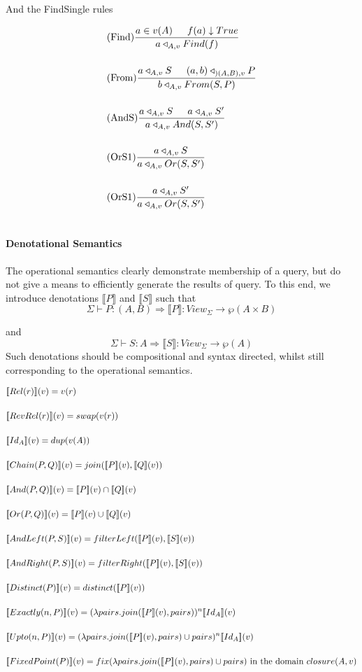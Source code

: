 \documentclass[12pt,a4paper,twoside,openright]{report}
\newcommand{\db}[1]{{\bf [\![}#1{\bf ]\!]}}
\newcommand{\deno}[1]{\db{#1}(v)}
\newcommand{\clos}[0]{closure(A, v)}
\newcommand{\opRule}[3]{#1 \triangleleft_{#2, v} #3}
\begin{document}
And the FindSingle rules

\begin{align}
&\displaystyle\mbox{(Find)}\frac{a \in v(A) \indent f(a)\downarrow True}{\opRule{a}{A}{Find(f)}} \\[3ex]
&\displaystyle\mbox{(From)}\frac{\opRule{a}{A}{S} \indent \opRule{(a,b)}{)(A, B)}{P}}{\opRule{b}{A}{From(S, P)}} \\[3ex]
&\displaystyle\mbox{(AndS)}\frac{\opRule{a}{A}{S} \indent \opRule{a}{A}{S'}}{\opRule{a}{A}{And(S, S')}} \\[3ex]
&\displaystyle\mbox{(OrS1)}\frac{\opRule{a}{A}{S}}{\opRule{a}{A}{Or(S, S')}} \\[3ex]
&\displaystyle\mbox{(OrS1)}\frac{\opRule{a}{A}{S'}}{\opRule{a}{A}{Or(S, S')}} \\[3ex]
\end{align}
\paragraph{Denotational Semantics}
The operational semantics clearly demonstrate membership of a query, but do not give a means to efficiently generate the results of query. To this end, we introduce denotations $\llbracket P \rrbracket$ and $\llbracket S \rrbracket$ such that \[\Sigma \vdash P \colon (A, B) \Rightarrow\llbracket P \rrbracket \colon View_{\Sigma} \rightarrow \wp(A \times B)\]

and \[\Sigma \vdash S \colon A \Rightarrow\llbracket S \rrbracket \colon View_{\Sigma} \rightarrow \wp(A)\] Such denotations should be compositional and syntax directed, whilst still corresponding to the operational semantics.

\begin{align}
& \deno{Rel(r)} = v(r) \\[3ex]
& \deno{RevRel(r)} = swap(v(r)) \\[3ex]
& \deno{Id_A} = dup(v(A)) \\[3ex]
& \deno{Chain(P, Q)} = join(\deno{P}, \deno{Q}) \\[3ex]
& \deno{And(P, Q)} = \deno{P} \cap \deno{Q} \\[3ex]
& \deno{Or(P, Q)} = \deno{P} \cup \deno{Q} \\[3ex]
& \deno{AndLeft(P, S)} = filterLeft(\deno{P}, \deno{S}) \\[3ex]
& \deno{AndRight(P, S)} = filterRight(\deno{P}, \deno{S}) \\[3ex]
& \deno{Distinct(P)} = distinct(\deno{P}) \\[3ex]
& \deno{Exactly(n, P)} = (\lambda pairs. join(\deno{P}, pairs))^n \deno{Id_A} \\[3ex]
& \deno{Upto(n, P)} = (\lambda pairs. join(\deno{P}, pairs) \cup pairs)^n \deno{Id_A} \\[3ex]
& \deno{FixedPoint(P)} = fix (\lambda pairs. join(\deno{P}, pairs) \cup pairs)  \mbox{ in the domain $\clos$}\\[3ex]
\end{align}
\end{document}

